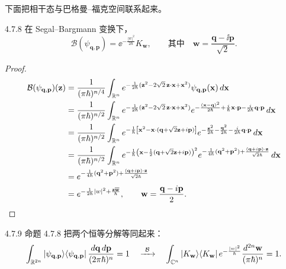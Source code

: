 下面把相干态与巴格曼–福克空间联系起来。

\begin{proposition}{4.7.8}
  在 Segal–Bargmann 变换下，
  \[
  \mathcal B(\psi_{\mathbf q,\mathbf p})
  =\ee^{-\frac{|w|^2}{2\hbar}}K_{\mathbf w},
  \qquad\text{其中}\quad
  \mathbf w=\frac{\mathbf q-\ii\mathbf p}{\sqrt2}.
  \]
\end{proposition}

\begin{proof}
\begin{align*}
\mathcal B(\psi_{\mathbf q,\mathbf p})(\mathbf z)
&=\frac{1}{(\pi\hbar)^{n/4}}\int_{\mathbb{R}^n}
e^{-\frac{1}{2\hbar}(\mathbf z^2-2\sqrt2\,\mathbf z\cdot\mathbf x
+\mathbf x^2)}\psi_{\mathbf q,\mathbf p}(\mathbf x)\,d\mathbf x\\
&=\frac{1}{(\pi\hbar)^{n/2}}\int_{\mathbb{R}^n}
e^{-\frac{1}{2\hbar}(\mathbf z^2-2\sqrt2\,\mathbf z\cdot\mathbf x
+\mathbf x^2)}
e^{-\frac{(\mathbf x-\mathbf q)^2}{2\hbar}
+\frac{i}{\hbar}\mathbf x\cdot\mathbf p-\frac{i}{2\hbar}\mathbf q\cdot\mathbf p}
\,d\mathbf x\\
&=\frac{1}{(\pi\hbar)^{n/2}}\int_{\mathbb{R}^n}
e^{-\frac{1}{\hbar}\left[\mathbf x^2-\mathbf x\cdot
(\mathbf q+\sqrt2\mathbf z+i\mathbf p)\right]}
e^{-\frac{\mathbf z^2}{2\hbar}-\frac{\mathbf q^2}{2\hbar}
-\frac{i}{2\hbar}\mathbf q\cdot\mathbf p}\,d\mathbf x\\
&=\frac{1}{(\pi\hbar)^{n/2}}\int_{\mathbb{R}^n}
e^{-\frac{1}{\hbar}\left(\mathbf x-\frac12(\mathbf q+\sqrt2\mathbf z
+i\mathbf p)\right)^2}
e^{-\frac{1}{4\hbar}(\mathbf q^2+\mathbf p^2)
+\frac{(\mathbf q+i\mathbf p)\cdot\mathbf z}{\sqrt2\hbar}}\,d\mathbf x\\
&=e^{-\frac{1}{4\hbar}(\mathbf q^2+\mathbf p^2)
+\frac{(\mathbf q+i\mathbf p)\cdot\mathbf z}{\sqrt2\hbar}}\\
&=e^{-\frac{1}{2\hbar}|w|^2+\frac{\mathbf z\overline{\mathbf w}}{\hbar}},
\qquad \mathbf w=\frac{\mathbf q-i\mathbf p}{2}.
\end{align*}
\end{proof}

\begin{remark}{4.7.9}
  命题 4.7.8 把两个恒等分解等同起来：
  \[
  \int_{\mathbb{R}^{2n}}|\psi_{\mathbf q,\mathbf p}\rangle\langle \psi_{\mathbf q,\mathbf p}|\,
  \frac{d\mathbf q\,d\mathbf p}{(2\pi\hbar)^n}=1
  \quad\xrightarrow{\ \mathcal B\ }\quad
  \int_{\mathbb{C}^n}|K_{\mathbf w}\rangle\langle K_{\mathbf w}|\,
  e^{-\frac{|w|^2}{\hbar}}\frac{d^{2n}\mathbf w}{(\pi\hbar)^n}=1.
  \]
\end{remark}

